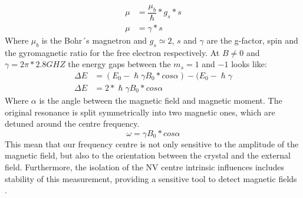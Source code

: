 \begin{align}
\mu&=\dfrac{\mu_{b}}{\hslash}*g_{s}*s \\
\mu&=\gamma*s
\end{align}
Where $\mu_{b}$ is the Bohr´s magnetron and $g_{s}\simeq 2$, $s$ and $\gamma$ are the g-factor, spin and the gyromagnetic ratio for the free electron respectively. \cite{meschede_gerthsen_2015} At $B\neq 0$ and $\gamma=2\pi*2.8GHZ$ the energy gaps between the $m_{s}=1$ and $-1$ looks like:
\begin{align}
	\Delta E&=(E_{0}-\hslash \gamma B_{0}*cos\alpha)-(E_{0}-\hslash \gamma \\	
	\Delta E&=2*\hslash \gamma B_{0}*cos\alpha
\end{align}
Where $\alpha $ is the angle between the magnetic ﬁeld and magnetic moment. The original resonance is split symmetrically into two magnetic ones, which are detuned around the centre frequency.
\begin{equation}
	\omega=\gamma B_{0}*cos\alpha
\end{equation}
This mean that our frequency centre is not only sensitive to the amplitude of the magnetic ﬁeld, but also to the orientation between the crystal and the external ﬁeld. Furthermore, the isolation of the NV centre intrinsic influences includes stability of this measurement, providing a sensitive tool to detect magnetic ﬁelds \cite{meschede_gerthsen_2015}.


